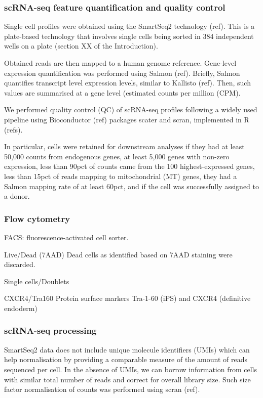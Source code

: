 \subsubsection{scRNA-seq feature quantification and quality control}

Single cell profiles were obtained using the SmartSeq2 technology (ref). 
This is a plate-based technology that involves single cells being sorted in 384 independent wells on a plate (section XX of the Introduction). 

Obtained reads are then mapped to a human genome reference. 
Gene-level expression quantification was performed using Salmon (ref). 
Briefly, Salmon quantifies transcript level expression levels, similar to Kallisto (ref).
Then, such values are summarised at a gene level (estimated counts per million (CPM).

We performed quality control (QC) of scRNA-seq profiles following a widely used pipeline using Bioconductor (ref) packages scater and scran, implemented in R (refs).  

In particular, cells were retained for downstream analyses if they had at least 50,000 counts from endogenous genes, at least 5,000 genes with non-zero expression, less than 90pct of counts came from the 100 highest-expressed genes, less than 15pct of reads mapping to mitochondrial (MT) genes, they had a Salmon mapping rate of at least 60pct, and if the cell was successfully assigned to a donor. 

\subsubsection{Flow cytometry}

FACS: fluorescence-activated cell sorter.

Live/Dead (7AAD)
Dead cells as identified based on 7AAD staining were discarded. 

Single cells/Doublets

CXCR4/Tra160 
Protein surface markers Tra-1-60 (iPS) and CXCR4 (definitive endoderm)

\subsubsection{scRNA-seq processing}

SmartSeq2 data does not include unique molecule identifiers (UMIs) which can help normalisation by providing a comparable measure of the amount of reads sequenced per cell. 
In the absence of UMIs, we can borrow information from cells with similar total number of reads and correct for overall library size. 
Such size factor normalisation of counts was performed using scran (ref). 

